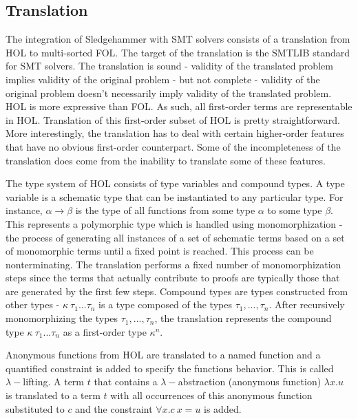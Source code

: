 \documentclass{article}
\begin{document}
	\subsection{Translation}
		The integration of Sledgehammer with SMT solvers 
		consists of a translation from HOL 
		to multi-sorted FOL. The target 
		of the translation is the SMTLIB standard for 
		SMT solvers. The translation is sound - 
		validity of the translated problem implies 
		validity of the original problem - but not 
		complete - validity of the original problem 
		doesn't necessarily imply validity of the 
		translated problem. HOL is more expressive 
		than FOL. As such, all first-order terms 
		are representable in HOL. Translation of this 
		first-order subset of HOL is pretty straightforward. 
		More interestingly, the translation has to deal 
		with certain higher-order features that have 
		no obvious first-order counterpart. Some of 
		the incompleteness of the translation does 
		come from the inability to translate some 
		of these features.
		
		The type system of HOL consists 
		of type variables and compound types.
		A type variable is a schematic type that 
		can be instantiated to any particular type.
		For instance, $\alpha \to \beta$ is the type
		of all functions from some type $\alpha$ to
		some type $\beta$. This represents a 
		polymorphic type which is handled using 
		monomorphization - the process of generating
		all instances of a set of schematic terms based 
		on a set of monomorphic terms until a fixed point
		is reached. This process can be nonterminating. 
		The translation performs a fixed number of 
		monomorphization steps since the terms that 
		actually contribute to proofs are 
		typically those that are generated by the 
		first few steps. Compound types 
		are types constructed from other types - 
		$\kappa\ \tau_1 ... \tau_n$ is a type composed of 
		the types $\tau_1, ..., \tau_n$. After 
		recursively monomorphizing the types 
		$\tau_1, ..., \tau_n$, the translation 
		represents the compound type 
		$\kappa\ \tau_1 ... \tau_n$ as a first-order 
		type $\kappa^n$.
		
		Anonymous functions from HOL are translated 
		to a named function and a quantified constraint
		is added to specify the functions behavior.
		This is called $\lambda-$lifting.
		A term $t$ that contains a $\lambda-$abstraction
		(anonymous function) $\lambda x.u$ is translated 
		to a term $t$ with all occurrences of this 
		anonymous function substituted to $c$ and 
		the constraint $\forall x. c\ x = u$ is added.
\end{document}
